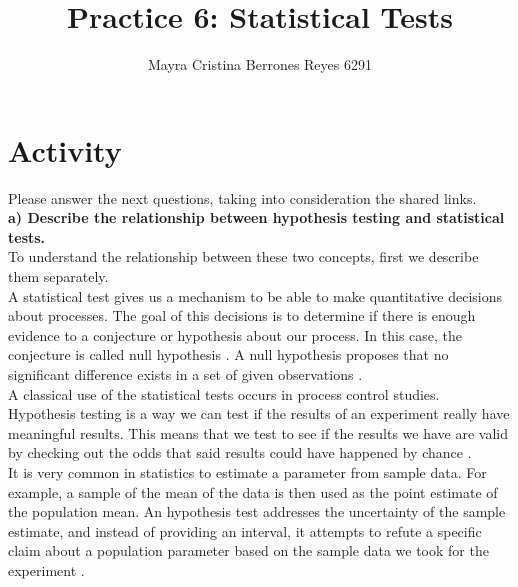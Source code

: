 \documentclass{article}
\begin{document}
\title{%
  Practice 6: Statistical Tests} %
\author{Mayra Cristina Berrones Reyes 6291}

\maketitle

\section{Activity}

Please answer the next questions, taking into consideration the shared links.\\

\textbf{a) Describe the relationship between hypothesis testing and statistical tests.}\\

To understand the relationship between these two concepts, first we describe them separately.\\

A statistical test gives us a mechanism to be able to make quantitative decisions about processes. The goal of this decisions is to determine if there is enough evidence to  a conjecture or hypothesis about our process. In this case, the conjecture is called null hypothesis \cite{montgomery2009}. A null hypothesis proposes that no significant difference exists in a set of given observations \cite{tdsc}.\\

A classical use of the statistical tests occurs in process control studies. \\

Hypothesis testing is a way we can test if the results of an experiment really have meaningful results. This means that we test to see if the results we have are valid by checking out the odds that said results could have happened by chance \cite{sthowto}. \\

It is very common in statistics to estimate a parameter from sample data. For example, a sample of the mean of the data is then used as the point estimate of the population mean. An hypothesis test addresses the uncertainty of the sample estimate, and instead of providing an interval, it attempts to refute a specific claim about a population parameter based on the sample data we took for the experiment \cite{montgomery2009}.\\
\end{document}
